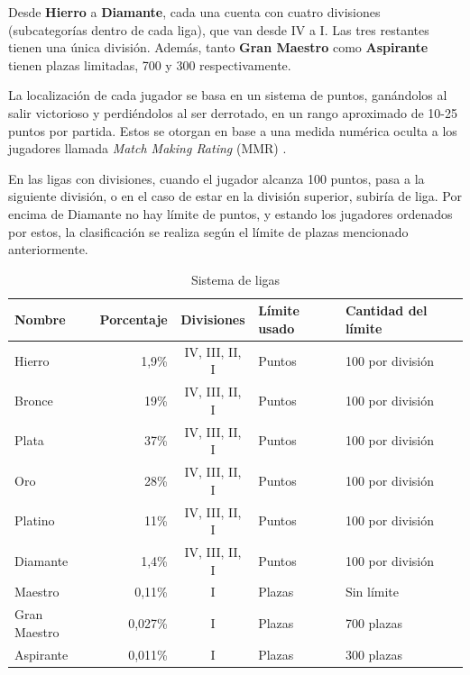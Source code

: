 Desde \textbf{Hierro} a \textbf{Diamante}, cada una cuenta con cuatro divisiones (subcategorías dentro de cada liga), que van desde IV a I. Las tres restantes tienen una única división. Además, tanto \textbf{Gran Maestro} como \textbf{Aspirante} tienen plazas limitadas, 700 y 300 respectivamente.

La localización de cada jugador se basa en un sistema de puntos, ganándolos al salir victorioso y perdiéndolos al ser derrotado, en un rango aproximado de 10-25 puntos por partida. Estos se otorgan en base a una medida numérica oculta a los jugadores llamada \textit{Match Making Rating} (MMR) \cite{lol_wiki_rank}.

En las ligas con divisiones, cuando el jugador alcanza 100 puntos,  pasa a la siguiente división, o en el caso de estar en la división superior, subiría de liga. Por encima de Diamante no hay límite de puntos, y estando los jugadores ordenados por estos, la clasificación se realiza según el límite de plazas mencionado anteriormente.

\begin{table}[h]
	\begin{tabular}{lrcll}\toprule
		\textbf{Nombre} & \textbf{Porcentaje} & \textbf{Divisiones} & \textbf{Límite usado} & \textbf{Cantidad del límite} \\ \midrule
		Hierro & 1,9\% & IV, III, II, I & Puntos  & 100 por división \\ 
		Bronce & 19\% & IV, III, II, I & Puntos  & 100 por división \\ 
		Plata & 37\% & IV, III, II, I & Puntos  & 100 por división \\ 
		Oro & 28\% & IV, III, II, I & Puntos  & 100 por división \\ 
		Platino & 11\% & IV, III, II, I & Puntos  & 100 por división \\ 
		Diamante & 1,4\% & IV, III, II, I & Puntos  & 100 por división \\ 
		Maestro & 0,11\% & I & Plazas  & Sin límite \\ 
		Gran Maestro & 0,027\% & I & Plazas  & 700 plazas \\ 
		Aspirante & 0,011\% & I & Plazas  & 300 plazas \\ \bottomrule
	\end{tabular}
	\caption{Sistema de ligas}
	\label{tab:ligas}
\end{table}
 

